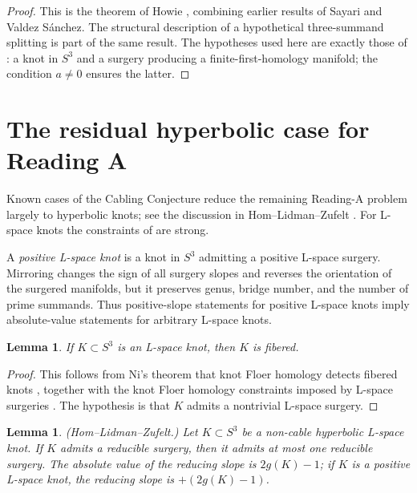 \documentclass[12pt]{article}
\newtheorem{lemma}[theorem]{Lemma}
\theoremstyle{definition}
\begin{document}
\begin{proof}
This is the theorem of Howie \cite{Howie}, combining earlier results of Sayari and Valdez Sánchez.  The structural description of a hypothetical three-summand splitting is part of the same result.  The hypotheses used here are exactly those of \cite{Howie}: a knot in \(S^3\) and a surgery producing a finite-first-homology manifold; the condition \(a\neq 0\) ensures the latter.
\end{proof}

\section{The residual hyperbolic case for Reading A}
\label{sec:residual}

Known cases of the Cabling Conjecture reduce the remaining Reading-A problem largely to hyperbolic knots; see the discussion in Hom--Lidman--Zufelt \cite{HLZ}.  For L-space knots the constraints of \cite{HLZ} are strong.

A \emph{positive L-space knot} is a knot in \(S^3\) admitting a positive L-space surgery.  Mirroring changes the sign of all surgery slopes and reverses the orientation of the surgered manifolds, but it preserves genus, bridge number, and the number of prime summands.  Thus positive-slope statements for positive L-space knots imply absolute-value statements for arbitrary L-space knots.

\begin{lemma}\label{lem:lspace-fibered}
If \(K\subset S^3\) is an L-space knot, then \(K\) is fibered.
\end{lemma}

\begin{proof}
This follows from Ni's theorem that knot Floer homology detects fibered knots \cite{Ni}, together with the knot Floer homology constraints imposed by L-space surgeries \cite{OSzRat}.  The hypothesis is that \(K\) admits a nontrivial L-space surgery.
\end{proof}

\begin{lemma}\label{lem:hlz-facts}
(Hom--Lidman--Zufelt.)  Let \(K\subset S^3\) be a non-cable hyperbolic L-space knot.  If \(K\) admits a reducible surgery, then it admits at most one reducible surgery.  The absolute value of the reducing slope is \(2g(K)-1\); if \(K\) is a positive L-space knot, the reducing slope is \(+(2g(K)-1)\).
\end{lemma}
\end{document}
